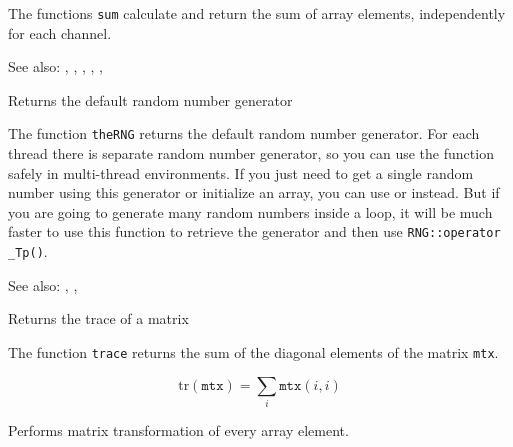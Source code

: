\begin{description}
\end{description}

The functions \texttt{sum} calculate and return the sum of array elements, independently for each channel.

See also: , , , , , 

Returns the default random number generator


The function \texttt{theRNG} returns the default random number generator. For each thread there is separate random number generator, so you can use the function safely in multi-thread environments. If you just need to get a single random number using this generator or initialize an array, you can use  or  instead. But if you are going to generate many random numbers inside a loop, it will be much faster to use this function to retrieve the generator and then use \texttt{RNG::operator \_Tp()}.

See also: , , 

Returns the trace of a matrix

\begin{description}
\end{description}

The function \texttt{trace} returns the sum of the diagonal elements of the matrix \texttt{mtx}.

\[ \mathrm{tr}(\texttt{mtx}) = \sum_i \texttt{mtx}(i,i) \]


Performs matrix transformation of every array element.

\begin{description}
\end{description}

